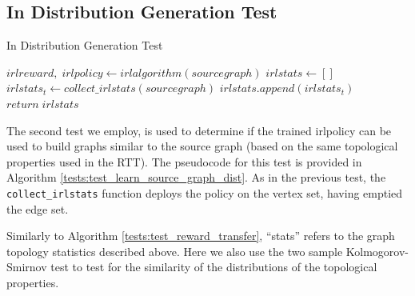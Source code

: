 \documentclass{report}
\numberwithin{equation}{section}
\numberwithin{figure}{section}
\numberwithin{table}{section}
\numberwithin{algorithm}{section}
\begin{document}
\subsection{In Distribution Generation Test}\label{sec:IDGT}

\begin{algorithm}
  \caption{In Distribution Generation Test}
  \label{tests:test_learn_source_graph_dist}
  \begin{algorithmic}
    \State $irlreward,\; irlpolicy \gets irlalgorithm(sourcegraph)$
    \State $irlstats \gets []$
    \State $irlstats_t\gets collect\_irlstats(sourcegraph)$
    \State $irlstats.append(irlstats_t)$
    \EndFor
    \State $return\; irlstats$
  \end{algorithmic}
\end{algorithm}
The second test we employ, is used to determine if the trained 
irlpolicy can be used 
to build graphs similar to the source graph (based on
the same topological properties used in the RTT). 
The pseudocode for this test is provided in Algorithm 
\ref{tests:test_learn_source_graph_dist}.
As in the previous test, the \verb|collect_irlstats| 
function deploys 
the policy on the vertex set, having emptied the edge set.

Similarly to Algorithm \ref{tests:test_reward_transfer}, ``stats'' 
refers to the graph topology statistics described above. Here we 
also use the two sample Kolmogorov-Smirnov test to test for 
the similarity of the distributions of the topological 
properties.


\end{document}
